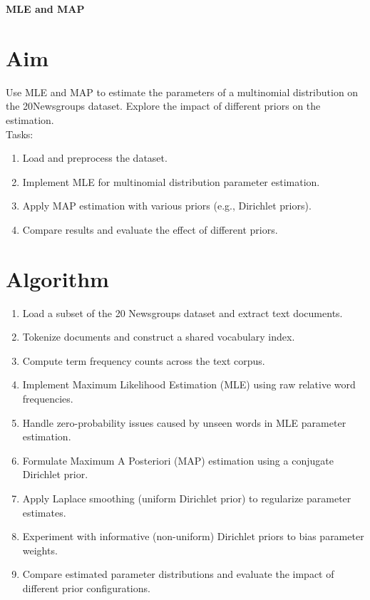 \documentclass[12pt, a4paper]{report}
\begin{document}
\begin{center}
	{\bfseries \Huge MLE and MAP}	
\end{center}

\section*{Aim} 
Use MLE and MAP to estimate the parameters of a multinomial distribution on the 20Newsgroups dataset. Explore
the impact of different priors on the estimation. \\
Tasks:
\begin{enumerate}[\quad -]
	\itemsep 0em 
	
	\item Load and preprocess the dataset.
	\item Implement MLE for multinomial distribution parameter estimation.
	\item Apply MAP estimation with various priors (e.g., Dirichlet priors).
	\item Compare results and evaluate the effect of different priors.
\end{enumerate}

\section*{Algorithm} 
\begin{enumerate}
	\item Load a subset of the 20 Newsgroups dataset and extract text documents.
	\item Tokenize documents and construct a shared vocabulary index.
	\item Compute term frequency counts across the text corpus.
	\item Implement Maximum Likelihood Estimation (MLE) using raw relative word frequencies.
	\item Handle zero-probability issues caused by unseen words in MLE parameter estimation.
	\item Formulate Maximum A Posteriori (MAP) estimation using a conjugate Dirichlet prior.
	\item Apply Laplace smoothing (uniform Dirichlet prior) to regularize parameter estimates.
	\item Experiment with informative (non-uniform) Dirichlet priors to bias parameter weights.
	\item Compare estimated parameter distributions and evaluate the impact of different prior configurations.
\end{enumerate}
\end{document}
